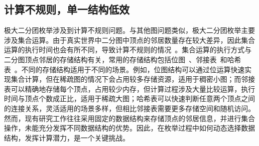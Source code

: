 
\subsection{计算不规则，单一结构低效}

极大二分团枚举涉及到计算不规则问题。与其他图问题类似，极大二分团枚举主要涉及集合运算。由于真实世界中二分图中顶点的邻居数量存在较大差异，因此集合运算的执行时间也会有所不同，导致计算不规则的情况~\cite{Irregularity12}。集合运算的执行方式与二分图顶点邻居的存储结构有关，常用的存储结构包括位图~\cite{lcm04,lcmmbc07,FCA15,FCA21,FCA22}、邻接表~\cite{iMBEA14,PMBE20,ooMBE22}和哈希表~\cite{parMBE18}。不同的存储结构适用于不同的场景。例如，位图结构可以通过位运算快速实现集合计算，但在稀疏图的情况下会占用较多存储资源，适用于稠密小图；而邻接表可以精确地存储每个顶点，占用较少内存，但计算过程涉及大量比较运算，执行时间与顶点个数成正比，适用于稀疏大图；哈希表可以快速判断任意两个顶点之间的连接关系，灵活适用的场景多样，但相比邻接表需要更多存储空间和随机访问。然而，现有研究工作往往采用固定的数据结构来存储顶点的邻居信息，并进行集合操作，未能充分发挥不同数据结构的优势。因此，在枚举过程中如何动态选择数据结构，发挥计算潜力，是一个关键挑战。




